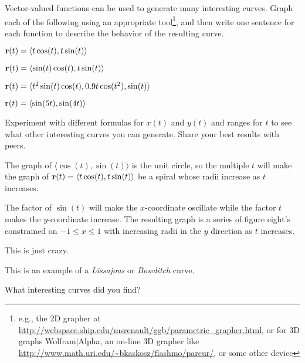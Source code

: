\begin{activity} \label{A:9.6.3} Vector-valued functions can be used to generate many interesting curves. Graph each of the following using an appropriate tool\footnote{e.g., the 2D grapher at \url{http://webspace.ship.edu/msrenault/ggb/parametric_grapher.html}, or for 3D graphs Wolfram$\mid$Alpha, an on-line 3D grapher like \url{http://www.math.uri.edu/~bkaskosz/flashmo/parcur/}, or some other device}, and then write one sentence for each function to describe the behavior of the resulting curve.
	\ba
	\item $\mathbf{r}(t) = \langle t\cos(t), t\sin(t) \rangle$

	\item $\mathbf{r}(t) = \langle \sin(t)\cos(t), t\sin(t) \rangle$

	\item $\mathbf{r}(t) = \langle t^2\sin(t)\cos(t), 0.9t\cos(t^2), \sin(t) \rangle$
	
	\item $\mathbf{r}(t) = \langle \sin(5t), \sin(4t) \rangle$

	\item Experiment with different formulas for $x(t)$ and $y(t)$ and ranges for $t$ to see what other interesting curves you can generate.  Share your best results with peers.

	\ea

\end{activity}
\begin{smallhint}

\end{smallhint}
\begin{bighint}

\end{bighint}
\begin{activitySolution}
	\ba
	\item The graph of $\langle \cos(t), \sin(t) \rangle$ is the unit circle, so the multiple $t$ will make the graph of $\mathbf{r}(t) = \langle t\cos(t), t\sin(t) \rangle$ be a spiral whose radii increase as $t$ increases. 
	
	\item The factor of $\sin(t)$ will make the $x$-coordinate oscillate while the factor $t$ makes the $y$-coordinate increase. The resulting graph is a series of figure eight's constrained on $-1 \leq x \leq 1$ with increasing radii in the $y$ direction as $t$ increases. 

	\item This is just crazy. 
	
	\item This is an example of a \emph{Lissajous} or \emph{Bowditch} curve.

	\item What interesting curves did you find?

	\ea 
\end{activitySolution}
\aftera
